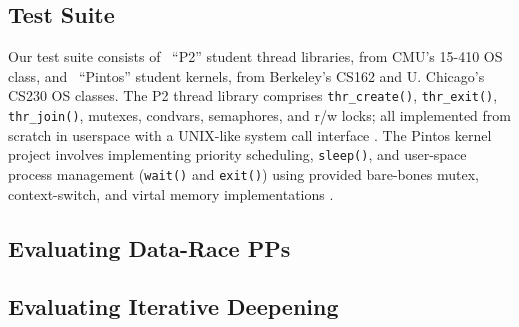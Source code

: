 \subsection{Test Suite}
Our test suite consists of \numthrlibs~``P2'' student thread libraries, from CMU's 15-410 OS class,
and \numpintoses~``Pintos'' student kernels, from Berkeley's CS162 and U. Chicago's CS230 OS classes.
%
The P2 thread library comprises \texttt{thr\_create()}, \texttt{thr\_exit()}, \texttt{thr\_join()}, mutexes, condvars, semaphores, and r/w locks;
all implemented from scratch in userspace with a UNIX-like system call interface \cite{kspec,thrlib}.
%
The Pintos kernel project
involves implementing priority scheduling, \texttt{sleep()}, and user-space process management (\texttt{wait()} and \texttt{exit()})
using provided bare-bones mutex, context-switch, and virtal memory implementations
\cite{pintos}.


\subsection{Evaluating Data-Race PPs}

\subsection{Evaluating Iterative Deepening}



